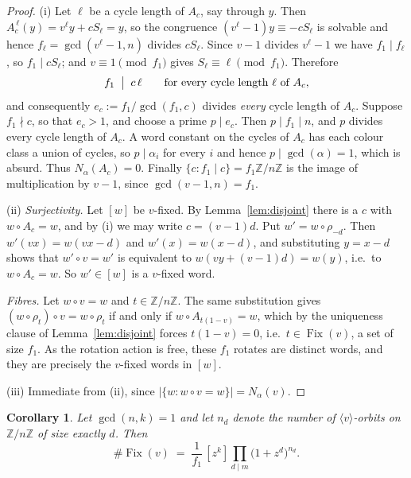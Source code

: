\documentclass[11pt,a4paper]{article}
\theoremstyle{plain}
\newtheorem{corollary}[theorem]{Corollary}
\theoremstyle{definition}
\theoremstyle{remark}
\newcommand{\Z}{\mathbb{Z}}
\newcommand{\Zn}{\Z/n\Z}
\newcommand{\Fix}{\operatorname{Fix}}
\begin{document}
\begin{proof}
(i) Let $\ell$ be a cycle length of $A_c$, say through $y$. Then
$A_c^{\,\ell}(y)=v^{\ell}y+cS_\ell=y$, so the congruence $(v^{\ell}-1)y\equiv-cS_\ell$ is
solvable and hence $f_\ell=\gcd(v^{\ell}-1,n)$ divides $cS_\ell$. Since $v-1$ divides
$v^{\ell}-1$ we have $f_1\mid f_\ell$, so $f_1\mid cS_\ell$; and $v\equiv1\pmod{f_1}$ gives
$S_\ell\equiv\ell\pmod{f_1}$. Therefore
\begin{equation}\label{eq:divide}
  f_1\;\bigm|\;c\,\ell\qquad\text{for every cycle length }\ell\text{ of }A_c,
\end{equation}
and consequently $e_c:=f_1/\gcd(f_1,c)$ divides \emph{every} cycle length of $A_c$. Suppose
$f_1\nmid c$, so that $e_c>1$, and choose a prime $p\mid e_c$. Then $p\mid f_1\mid n$, and
$p$ divides every cycle length of $A_c$. A word constant on the cycles of $A_c$ has each
colour class a union of cycles, so $p\mid\alpha_i$ for every $i$ and hence
$p\mid\gcd(\alpha)=1$, which is absurd. Thus $N_\alpha(A_c)=0$. Finally
$\{c:f_1\mid c\}=f_1\Zn$ is the image of multiplication by $v-1$, since
$\gcd(v-1,n)=f_1$.

(ii) \emph{Surjectivity.} Let $[w]$ be $v$-fixed. By Lemma~\ref{lem:disjoint} there is a $c$
with $w\circ A_c=w$, and by (i) we may write $c=(v-1)d$. Put $w'=w\circ\rho_{-d}$. Then
$w'(vx)=w(vx-d)$ and $w'(x)=w(x-d)$, and substituting $y=x-d$ shows that $w'\circ v=w'$ is
equivalent to $w(vy+(v-1)d)=w(y)$, i.e.\ to $w\circ A_c=w$. So $w'\in[w]$ is a $v$-fixed
word.

\emph{Fibres.} Let $w\circ v=w$ and $t\in\Zn$. The same substitution gives
$(w\circ\rho_t)\circ v=w\circ\rho_t$ if and only if $w\circ A_{t(1-v)}=w$, which by the
uniqueness clause of Lemma~\ref{lem:disjoint} forces $t(1-v)=0$, i.e.\ $t\in\Fix(v)$, a set
of size $f_1$. As the rotation action is free, these $f_1$ rotates are distinct words, and
they are precisely the $v$-fixed words in $[w]$.

(iii) Immediate from (ii), since $|\{w:w\circ v=w\}|=N_\alpha(v)$.
\end{proof}

\begin{corollary}\label{cor:twocolour}
Let $\gcd(n,k)=1$ and let $n_d$ denote the number of $\langle v\rangle$-orbits on $\Zn$ of
size exactly $d$. Then
\begin{equation}\label{eq:fixgf}
  \#\Fix(v)\;=\;\frac1{f_1}\,[z^k]\prod_{d\mid m}\bigl(1+z^{d}\bigr)^{n_d}.
\end{equation}
\end{corollary}
\end{document}
